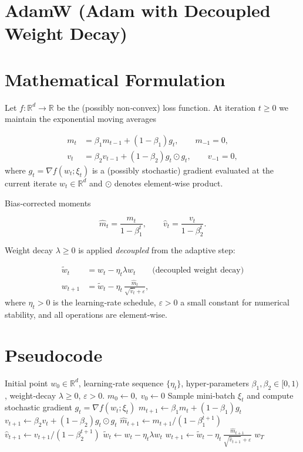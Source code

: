 \documentclass{article}
\newcommand{\R}{\mathbb{R}}
\begin{document}
\section*{AdamW (Adam with Decoupled Weight Decay)}

\section*{Mathematical Formulation}
Let $f:\R^{d}\rightarrow\R$ be the (possibly non‑convex) loss function.  
At iteration $t\ge 0$ we maintain the exponential moving averages  

\[
\begin{aligned}
m_{t} &= \beta_{1} m_{t-1} + (1-\beta_{1}) g_{t}, \qquad m_{-1}=0,\\[2mm]
v_{t} &= \beta_{2} v_{t-1} + (1-\beta_{2}) g_{t}\odot g_{t}, \qquad v_{-1}=0,
\end{aligned}
\]
where $g_{t}= \nabla f(w_{t};\xi_{t})$ is a (possibly stochastic) gradient evaluated at the current iterate $w_{t}\in\R^{d}$ and $\odot$ denotes element‑wise product.  

Bias‑corrected moments  

\[
\hat m_{t}= \frac{m_{t}}{1-\beta_{1}^{t}},\qquad
\hat v_{t}= \frac{v_{t}}{1-\beta_{2}^{t}} .
\]

Weight decay $\lambda\ge0$ is applied \emph{decoupled} from the adaptive step:

\[
\boxed{
\begin{aligned}
\tilde w_{t} &= w_{t} - \eta_{t}\lambda w_{t}\qquad\text{(decoupled weight decay)}\\[1mm]
w_{t+1}   &= \tilde w_{t}
            - \eta_{t}\,\frac{\hat m_{t}}{\sqrt{\hat v_{t}}+\varepsilon},
\end{aligned}}
\]
where $\eta_{t}>0$ is the learning‑rate schedule, $\varepsilon>0$ a small constant for numerical stability, and all operations are element‑wise.  

\section*{Pseudocode}
\begin{algorithm}[H]
\caption{AdamW}
\begin{algorithmic}[1]
\Require Initial point $w_{0}\in\R^{d}$, learning‑rate sequence $\{\eta_{t}\}$,
        hyper‑parameters $\beta_{1},\beta_{2}\in[0,1)$,
        weight‑decay $\lambda\ge0$, $\varepsilon>0$.
\State $m_{0}\gets 0,\;v_{0}\gets 0$
    \State Sample mini‑batch $\xi_{t}$ and compute stochastic gradient $g_{t}= \nabla f(w_{t};\xi_{t})$
    \State $m_{t+1}\gets \beta_{1}m_{t}+(1-\beta_{1})g_{t}$
    \State $v_{t+1}\gets \beta_{2}v_{t}+(1-\beta_{2})g_{t}\odot g_{t}$
    \State $\hat m_{t+1}\gets m_{t+1}/(1-\beta_{1}^{t+1})$
    \State $\hat v_{t+1}\gets v_{t+1}/(1-\beta_{2}^{t+1})$
    \State $\tilde w_{t}\gets w_{t}-\eta_{t}\lambda w_{t}$ 
    \State $w_{t+1}\gets \tilde w_{t}
               -\eta_{t}\,\frac{\hat m_{t+1}}{\sqrt{\hat v_{t+1}}+\varepsilon}$
\EndFor
\State \Return $w_{T}$
\end{algorithmic}
\end{algorithm}
\end{document}

